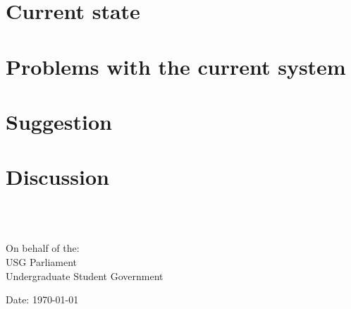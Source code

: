 \documentclass[a4paper,10pt]{article}
\begin{document}
	\tableofcontents
	\thispagestyle{main}
	\section{Current state}
		
	\section{Problems with the current system}
		
  \section{Suggestion}
	  
  \section{Discussion}
	  
	  \ \\\ \\
  \begin{minipage}{0.5\textwidth}
  	\begin{flushleft}
  		On behalf of the:\\
  		USG Parliament\\
  		Undergraduate Student Government
  	\end{flushleft}
  \end{minipage}
\begin{minipage}{0.5\textwidth}
\begin{flushright}
Date: \today\\\ \\\ 
\end{flushright}
\end{minipage}
	\label{theEnd}
\end{document}
